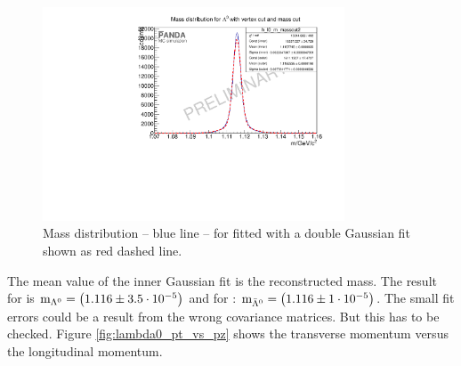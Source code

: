 		\begin{figure}
			\centering
				\includegraphics[width=0.8\textwidth]{./plots/lambda0/lambda0_m_masscut2.pdf}
			\caption{Mass distribution -- blue line -- for \lam fitted with a double Gaussian fit shown as red dashed line.}
			\label{fig:lambda0_massfit}
		\end{figure}
		
		The mean value of the inner Gaussian fit is the reconstructed mass.
		The result for \lam is $\textnormal{m}_{\Lambda^0} = \left(1.116 \pm 3.5\cdot 10^{-5}\right)$ \massunit and for \alam: $\textnormal{m}_{\bar{\Lambda}^0} = \left(1.116 \pm 1\cdot 10^{-5}\right)$\massunit. 
		The small fit errors could be a result from the wrong covariance matrices. 
		But this has to be checked. 
		Figure \ref{fig:lambda0_pt_vs_pz} shows the transverse momentum versus the longitudinal momentum.
				
